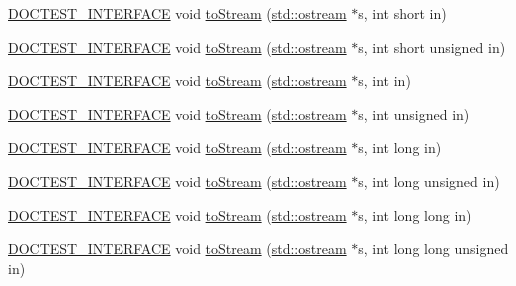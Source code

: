 \begin{DoxyCompactItemize}
\item 
\hyperlink{doctest_8h_a9c16ffc635ec47f07797d21ede26b1a5}{D\+O\+C\+T\+E\+S\+T\+\_\+\+I\+N\+T\+E\+R\+F\+A\+CE} void \hyperlink{namespacedoctest_1_1detail_aaa111edaaf87cd57961d2c1923d762cb}{to\+Stream} (\hyperlink{doctest_8h_a116af65cb5e924b33ad9d9ecd7a783f3}{std\+::ostream} $\ast$s, int short in)
\item 
\hyperlink{doctest_8h_a9c16ffc635ec47f07797d21ede26b1a5}{D\+O\+C\+T\+E\+S\+T\+\_\+\+I\+N\+T\+E\+R\+F\+A\+CE} void \hyperlink{namespacedoctest_1_1detail_a72d0259a5b3c0f0f3a88ea8d732223f8}{to\+Stream} (\hyperlink{doctest_8h_a116af65cb5e924b33ad9d9ecd7a783f3}{std\+::ostream} $\ast$s, int short unsigned in)
\item 
\hyperlink{doctest_8h_a9c16ffc635ec47f07797d21ede26b1a5}{D\+O\+C\+T\+E\+S\+T\+\_\+\+I\+N\+T\+E\+R\+F\+A\+CE} void \hyperlink{namespacedoctest_1_1detail_af6f60470d3f0f2b858a03dad822ca9c6}{to\+Stream} (\hyperlink{doctest_8h_a116af65cb5e924b33ad9d9ecd7a783f3}{std\+::ostream} $\ast$s, int in)
\item 
\hyperlink{doctest_8h_a9c16ffc635ec47f07797d21ede26b1a5}{D\+O\+C\+T\+E\+S\+T\+\_\+\+I\+N\+T\+E\+R\+F\+A\+CE} void \hyperlink{namespacedoctest_1_1detail_a7001b8028c2c21968f2a0deb3417e9a4}{to\+Stream} (\hyperlink{doctest_8h_a116af65cb5e924b33ad9d9ecd7a783f3}{std\+::ostream} $\ast$s, int unsigned in)
\item 
\hyperlink{doctest_8h_a9c16ffc635ec47f07797d21ede26b1a5}{D\+O\+C\+T\+E\+S\+T\+\_\+\+I\+N\+T\+E\+R\+F\+A\+CE} void \hyperlink{namespacedoctest_1_1detail_a830b2dd9dae3bc74ae0c9002b7a2dbed}{to\+Stream} (\hyperlink{doctest_8h_a116af65cb5e924b33ad9d9ecd7a783f3}{std\+::ostream} $\ast$s, int long in)
\item 
\hyperlink{doctest_8h_a9c16ffc635ec47f07797d21ede26b1a5}{D\+O\+C\+T\+E\+S\+T\+\_\+\+I\+N\+T\+E\+R\+F\+A\+CE} void \hyperlink{namespacedoctest_1_1detail_a82d6e6a85cac7cfb399d8215308369fc}{to\+Stream} (\hyperlink{doctest_8h_a116af65cb5e924b33ad9d9ecd7a783f3}{std\+::ostream} $\ast$s, int long unsigned in)
\item 
\hyperlink{doctest_8h_a9c16ffc635ec47f07797d21ede26b1a5}{D\+O\+C\+T\+E\+S\+T\+\_\+\+I\+N\+T\+E\+R\+F\+A\+CE} void \hyperlink{namespacedoctest_1_1detail_a359e9b95a3fbe0322056d9d9c7385cde}{to\+Stream} (\hyperlink{doctest_8h_a116af65cb5e924b33ad9d9ecd7a783f3}{std\+::ostream} $\ast$s, int long long in)
\item 
\hyperlink{doctest_8h_a9c16ffc635ec47f07797d21ede26b1a5}{D\+O\+C\+T\+E\+S\+T\+\_\+\+I\+N\+T\+E\+R\+F\+A\+CE} void \hyperlink{namespacedoctest_1_1detail_a22df719818a3df2b975ba0f7045cc8fd}{to\+Stream} (\hyperlink{doctest_8h_a116af65cb5e924b33ad9d9ecd7a783f3}{std\+::ostream} $\ast$s, int long long unsigned in)

\end{DoxyCompactItemize}
